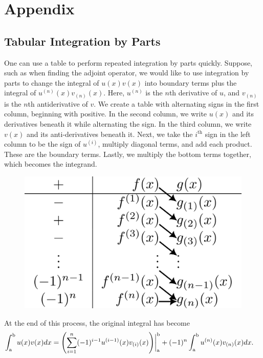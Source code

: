 \newpage
\section{Appendix}
\subsection{Tabular Integration by Parts}
\label{appendix:parts}
    One can use a table to perform repeated integration by parts quickly. Suppose, such as when finding the adjoint operator, we would like to use integration by parts to change the integral of \(u(x)v(x)\) into boundary terms plus the integral of \(u^{(n)}(x)v_{(n)}(x)\). Here, \(u^{(n)}\) is the \(n\)th derivative of \(u\), and \(v_{(n)}\) is the \(n\)th antiderivative of \(v\). We create a table with alternating signs in the first column, beginning with positive. In the second column, we write \(u(x)\) and its derivatives beneath it while alternating the sign. In the third column, we write \(v(x)\) and its anti-derivatives beneath it. 
    Next, we take the \(i^{\mathrm{th}}\) sign in the left column to be the sign of \(u^{(i)}\), multiply diagonal terms, and add each product.
    These are the boundary terms. Lastly, we multiply the bottom terms together, which becomes the integrand. 
    \begin{figure}[H]
        \centering
        \includegraphics[width=0.34\linewidth]{include/tabular-boundary.png}
    \end{figure}
    At the end of this process, the original integral has become 
    \begin{equation*}
        \begin{split}
            \int_\mathrm{a}^\mathrm{b} u(x)v(x) dx &= \left(\sum_{i=1}^{n} (-1)^{i-1}u^{(i-1)}(x)v_{(i)}(x)\right)\biggr\rvert_\mathrm{a}^\mathrm{b} + (-1)^n\int_\mathrm{a}^\mathrm{b} u^{(n)}(x)v_{(n)}(x) dx.
        \end{split}
    \end{equation*}
